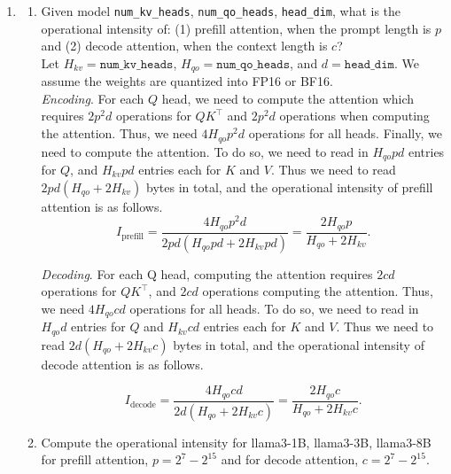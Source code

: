 \documentclass[12pt]{article}
\begin{document}
\begin{enumerate}[label=\textbf{Q\arabic*.}]
    \item 
    \begin{enumerate}
        \item Given model \texttt{num\_kv\_heads}, \texttt{num\_qo\_heads}, \texttt{head\_dim}, what is the operational intensity of: (1) prefill attention, when the prompt length is $p$ and (2) decode attention, when the context length is $c$? \\

        Let $H_{kv} = \texttt{num\_kv\_heads}$,
          $H_{qo} = \texttt{num\_qo\_heads}$,
          and $d = \texttt{head\_dim}$.
        We assume the weights are quantized into FP16 or BF16. \\

        \emph{Encoding}.
        For each $Q$ head, we need to compute the attention which requires $2p^2d$ operations for $QK^{\top}$ and $2p^2d$ operations when computing the attention. Thus, we need $4H_{qo} p^2 d$ operations for all heads. Finally, we need to compute the attention. To do so,
        we need to read in $H_{qo}pd$ entries for $Q$,
        and $H_{kv}pd$ entries each for $K$ and $V$.
        Thus
          we need to read $2pd(H_{qo} + 2H_{kv})$
          bytes in total, and
          the operational intensity of prefill attention is as follows.
        \[
            I_{\text{prefill}} =
            \frac{4H_{qo} p^2 d}{2pd(H_{qo}pd + 2H_{kv}pd)}
            = \frac{2H_{qo} p}{H_{qo} + 2H_{kv}}.
        \]

        \emph{Decoding}.
        For each Q head,
          computing the attention requires
          $2cd$ operations for $QK^{\top}$,
          and $2cd$ operations computing the attention.
        Thus, we need $4H_{qo} cd$ operations for all heads. To do so,
          we need to read in $H_{qo}d$ entries for $Q$
          and $H_{kv}cd$ entries each for $K$ and $V$.
        Thus
          we need to read $2d(H_{qo} + 2H_{kv}c)$
          bytes in total, and
          the operational intensity of decode attention is as follows.
          
        \[
            I_{\text{decode}} =
            \frac{4H_{qo} cd}{2d(H_{qo} + 2H_{kv}c)}
            = \frac{2H_{qo} c}{H_{qo} + 2H_{kv}c}.
        \]

        \item Compute the operational intensity for llama3-1B, llama3-3B, llama3-8B  for prefill attention, $p = 2^7 - 2^{15}$ and for decode attention, $c = 2^7 - 2^{15}$. \\


\end{enumerate}
\end{enumerate}
\end{document}

